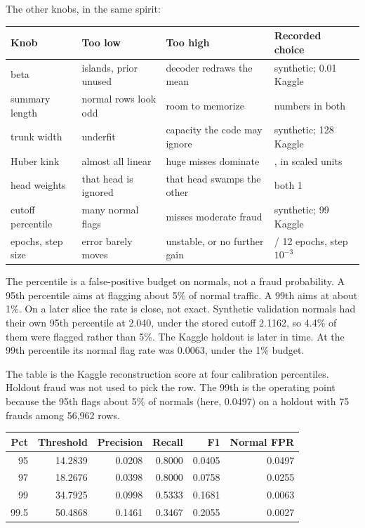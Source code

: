 \documentclass[11pt]{article}
\begin{document}
The other knobs, in the same spirit:

\begin{center}
\footnotesize
\begin{tabular}{@{}l>{\raggedright\arraybackslash}p{}>{\raggedright\arraybackslash}p{}>{\raggedright\arraybackslash}p{}@{}}
\toprule
Knob & Too low & Too high & Recorded choice \\
\midrule
beta &
islands, prior unused &
decoder redraws the mean &
0.1 synthetic; 0.01 Kaggle \\
summary length &
normal rows look odd &
room to memorize &
6 numbers in both \\
trunk width &
underfit &
capacity the code may ignore &
64 synthetic; 128 Kaggle \\
Huber kink &
almost all linear &
huge misses dominate &
1, in scaled units \\
head weights &
that head is ignored &
that head swamps the other &
both 1 \\
cutoff percentile &
many normal flags &
misses moderate fraud &
95 synthetic; 99 Kaggle \\
epochs, step size &
error barely moves &
unstable, or no further gain &
25 / 12 epochs, step $10^{-3}$ \\
\bottomrule
\end{tabular}
\end{center}

The percentile is a false-positive budget on normals, not a fraud
probability. A 95th percentile aims at flagging about 5\% of normal
traffic. A 99th aims at about 1\%. On a later slice the rate is close,
not exact. Synthetic validation normals had their own 95th percentile at
2.040, under the stored cutoff 2.1162, so 4.4\% of them were flagged
rather than 5\%. The Kaggle holdout is later in time. At the 99th
percentile its normal flag rate was 0.0063, under the 1\% budget.

The table is the Kaggle reconstruction score at four calibration
percentiles. Holdout fraud was not used to pick the row. The 99th is the
operating point because the 95th flags about 5\% of normals
(here, 0.0497) on a holdout with 75 frauds among 56{,}962 rows.

\begin{center}
\small
\begin{tabular}{@{}rrrrrr@{}}
\toprule
Pct & Threshold & Precision & Recall & F1 & Normal FPR \\
\midrule
95   & 14.2839 & 0.0208 & 0.8000 & 0.0405 & 0.0497 \\
97   & 18.2676 & 0.0398 & 0.8000 & 0.0758 & 0.0255 \\
99   & 34.7925 & 0.0998 & 0.5333 & 0.1681 & 0.0063 \\
99.5 & 50.4868 & 0.1461 & 0.3467 & 0.2055 & 0.0027 \\
\bottomrule
\end{tabular}
\end{center}
\end{document}
